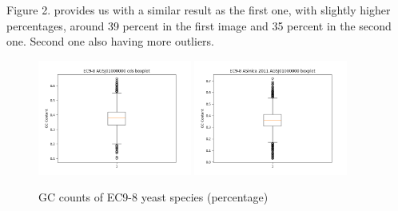 Figure 2. provides us with a similar result as the first one, with slightly higher percentages, around 39 percent in the first image and 35 percent in the second one. Second one also having more outliers.
\begin{figure}[htbp]
  \centering
  \includegraphics[width=0.45\textwidth]{images/EC9-8_AGSJ01000000_cds_boxplot.png}
  \hfill
  \includegraphics[width=0.45\textwidth]{images/EC9-8_ASinica_2011_AGSJ01000000_boxplot.png}
  \caption{GC counts of EC9-8 yeast species (percentage)}
  \label{fig:combined-images}
\end{figure}



